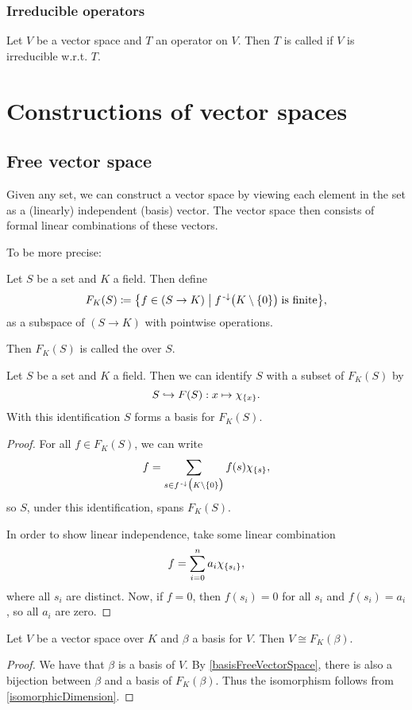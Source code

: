 \subsubsection{Irreducible operators}
\begin{definition}
Let $V$ be a vector space and $T$ an operator on $V$. Then $T$ is called  if $V$ is irreducible w.r.t. $T$.
\end{definition}

\section{Constructions of vector spaces}
\subsection{Free vector space}
Given any set, we can construct a vector space by viewing each element in the set as a (linearly) independent (basis) vector. The vector space then consists of formal linear combinations of these vectors.

To be more precise:
\begin{definition}
Let $S$ be a set and $K$ a field. Then define
\[ F_K(S) \defeq \setbuilder{f\in(S\to K)}{f^{\preimf}\big(K\setminus\{0\}\big)\;\text{is finite}}, \]
as a subspace of $(S\to K)$ with pointwise operations.

Then $F_K(S)$ is called the  over $S$.
\end{definition}

\begin{proposition} \label{basisFreeVectorSpace}
Let $S$ be a set and $K$ a field. Then we can identify $S$ with a subset of $F_K(S)$ by
\[ S\hookrightarrow F(S): x\mapsto \chi_{\{x\}}. \]
With this identification $S$ forms a basis for $F_K(S)$.
\end{proposition}
\begin{proof}
For all $f\in F_K(S)$, we can write
\[ f = \sum_{s\in f^{{\text{\hspace{0.15em}-}\downarrow}}\big(K\setminus\{0\}\big)}f(s)\chi_{\{s\}}, \]
so $S$, under this identification, spans $F_K(S)$.

In order to show linear independence, take some linear combination
\[ f = \sum_{i=0}^n a_i \chi_{\{s_i\}}, \]
where all $s_i$ are distinct.
Now, if $f = 0$, then $f(s_i) = 0$ for all $s_i$ and $f(s_i) = a_i$, so all $a_i$ are zero.
\end{proof}

\begin{lemma}
Let $V$ be a vector space over $K$ and $\beta$ a basis for $V$. Then $V\cong  F_K(\beta)$.
\end{lemma}
\begin{proof}
We have that $\beta$ is a basis of $V$. By \ref{basisFreeVectorSpace}, there is also a bijection between $\beta$ and a basis of $F_K(\beta)$. Thus the isomorphism follows from \ref{isomorphicDimension}.
\end{proof}

